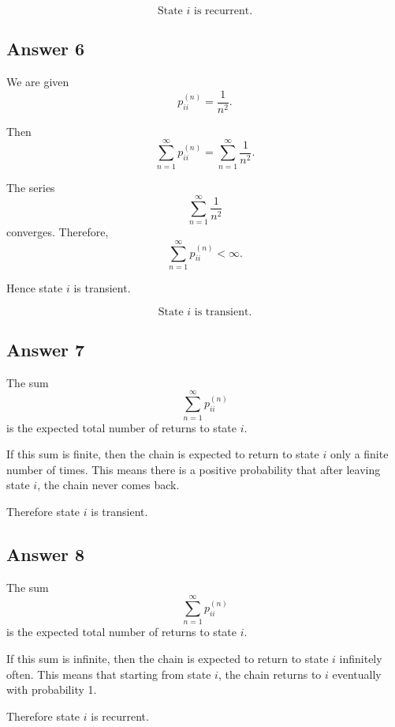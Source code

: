 \documentclass[12pt,a4paper]{article}
\theoremstyle{notestyle}
\begin{document}
\[
\boxed{\text{State }i\text{ is recurrent.}}
\]

\subsection*{Answer 6}

We are given
\[
p_{ii}^{(n)}=\frac1{n^2}.
\]

Then
\[
\sum_{n=1}^{\infty}p_{ii}^{(n)}
=
\sum_{n=1}^{\infty}\frac1{n^2}.
\]

The series
\[
\sum_{n=1}^{\infty}\frac1{n^2}
\]
converges. Therefore,
\[
\sum_{n=1}^{\infty}p_{ii}^{(n)}<\infty.
\]

Hence state $i$ is transient.

\[
\boxed{\text{State }i\text{ is transient.}}
\]

\subsection*{Answer 7}

The sum
\[
\sum_{n=1}^{\infty}p_{ii}^{(n)}
\]
is the expected total number of returns to state $i$.

If this sum is finite, then the chain is expected to return to state $i$ only a finite number of times. This means there is a positive probability that after leaving state $i$, the chain never comes back.

Therefore state $i$ is transient.

\subsection*{Answer 8}

The sum
\[
\sum_{n=1}^{\infty}p_{ii}^{(n)}
\]
is the expected total number of returns to state $i$.

If this sum is infinite, then the chain is expected to return to state $i$ infinitely often. This means that starting from state $i$, the chain returns to $i$ eventually with probability 1.

Therefore state $i$ is recurrent.
\end{document}
